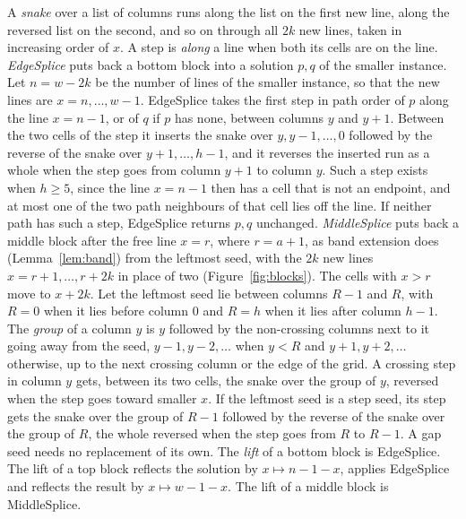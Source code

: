 \documentclass[11pt]{article}
\begin{document}
A \emph{snake} over a list of columns runs along the list on the first new line, along the reversed
list on the second, and so on through all $2k$ new lines, taken in increasing order of $x$. A step
is \emph{along} a line when both its cells are on the line. \emph{EdgeSplice} puts back
a bottom block into a solution $p,q$ of the smaller instance. Let $n=w-2k$ be the number of lines of
the smaller instance, so that the new lines are $x=n,\ldots,w-1$. EdgeSplice takes the first step in
path order of $p$ along the line $x=n-1$, or of $q$ if $p$ has none, between columns $y$ and $y+1$.
Between the two cells of the step it inserts the snake over $y,y-1,\ldots,0$ followed by the
reverse of the snake over $y+1,\ldots,h-1$, and it reverses the inserted run as a whole when the
step goes from column $y+1$ to column $y$. Such a step exists when $h\ge 5$, since the line $x=n-1$
then has a cell that is not an endpoint, and at most one of the two path neighbours of that cell
lies off the line. If neither path has such a step, EdgeSplice returns $p,q$ unchanged.
\emph{MiddleSplice} puts back a middle block after the free line $x=r$, where $r=a+1$, as band
extension does (Lemma~\ref{lem:band}) from the leftmost seed, with the $2k$ new lines
$x=r+1,\ldots,r+2k$ in place of two (Figure~\ref{fig:blocks}). The cells with $x>r$ move to $x+2k$.
Let the leftmost seed lie between columns $R-1$ and $R$, with $R=0$ when it lies before column $0$
and $R=h$ when it lies after column $h-1$. The \emph{group} of a column $y$ is $y$
followed by the non-crossing columns next to it going away from the seed, $y-1,y-2,\ldots$ when
$y<R$ and $y+1,y+2,\ldots$ otherwise, up to the next crossing column or the edge of the grid. A crossing step in column $y$ gets, between its two cells,
the snake over the group of $y$, reversed when the step goes toward smaller $x$. If the leftmost seed
is a step seed, its step gets the snake over the group of $R-1$ followed by the reverse of the snake
over the group of $R$, the whole reversed when the step goes from $R$ to $R-1$. A gap seed needs no
replacement of its own. The \emph{lift} of a bottom block is EdgeSplice.
The lift of a top block reflects the solution by $x\mapsto n-1-x$, applies EdgeSplice and reflects
the result by $x\mapsto w-1-x$. The lift of a middle block is MiddleSplice.
\end{document}
